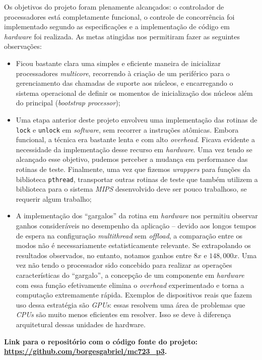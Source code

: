 \documentclass[11pt, a4paper]{article}
\begin{document}
Os objetivos do projeto foram plenamente alcançados: o controlador de processadores está completamente funcional, o controle de concorrência foi implementado segundo as especificações e a implementação de código em \textit{hardware} foi realizada. As metas atingidas nos permitiram fazer as seguintes observações:
\begin{itemize}
\item Ficou bastante clara uma simples e eficiente maneira de inicializar processadores \textit{multicore}, recorrendo à criação de um periférico para o gerenciamento das chamadas de suporte aos núcleos, e encarregando o sistema operacional de definir os momentos de inicialização dos núcleos além do principal (\textit{bootstrap processor});
\item Uma etapa anterior deste projeto envolveu uma implementação das rotinas de \texttt{lock} e \texttt{unlock} em \textit{software}, sem recorrer a instruções atômicas. Embora funcional, a técnica era bastante lenta e com alto \textit{overhead}. Ficava evidente a necessidade da implementação desse recurso em \textit{hardware}. Uma vez tendo se alcançado esse objetivo, pudemos perceber a mudança em performance das rotinas de teste. Finalmente, uma vez que fizemos \textit{wrappers} para funções da biblioteca \texttt{pthread}, transportar outras rotinas de teste que também utilizem a biblioteca para o sistema \textit{MIPS} desenvolvido deve ser pouco trabalhoso, se requerir algum trabalho;
\item A implementação dos ``gargalos'' da rotina em \textit{hardware} nos permitiu observar ganhos consideráveis no desempenho da aplicação -- devido aos longos tempos de espera na configuração \textit{multithread} sem \textit{offload}, a comparação entre os modos não é necessariamente estatisticamente relevante. Se extrapolando os resultados observados, no entanto, notamos ganhos entre $8x$ e $148,000x$. Uma vez não tendo o processador sido concebido para realizar as operações características do ``gargalo'', a concepção de um componente em \textit{hardware} com essa função efetivamente elimina o \textit{overhead} experimentado e torna a computação extremamente rápida. Exemplos de dispositivos reais que fazem uso dessa estratégia são \textit{GPUs}: essas resolvem uma área de problemas que \textit{CPUs} são muito menos eficientes em resolver. Isso se deve à diferença arquitetural dessas unidades de hardware.

\end{itemize}

\textbf{Link para o repositório com o código fonte do projeto: \url{https://github.com/borgesgabriel/mc723_p3}.}

% 
% 
\end{document}
